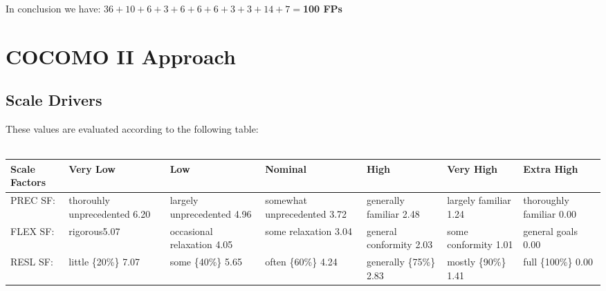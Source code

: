 \documentclass[12pt, oneside]{book}   	%
\begin{document}
In conclusion we have: $36 + 10 + 6 + 3 +6 + 6 + 6 + 3 + 3 +14 + 7 =$\textbf{100 FPs}
\chapter{COCOMO II Approach}
\section{Scale Drivers}
These values are evaluated according to the following table:
\\ \\
\begin{table}[h]
\centering
\begin{tabular}{|p{1.5cm}|p{2cm}|p{2cm}|p{2cm}|p{1.5cm}|p{2cm}|p{2cm}|}
\hline
Scale Factors & \multirow{2}{*}{Very Low} & \multirow{2}{*}{Low} & \multirow{2}{*}{Nominal} & \multirow{2}{*}{High} & \multirow{2}{*}{Very High} & \multirow{2}{*}{Extra High} \\
\hline
PREC \newline \newline SF: & \scriptsize{thorouhly unprecedented} \normalsize{6.20} & \scriptsize{largely unprecedented}  \normalsize{4.96} & \scriptsize{somewhat unprecedented} \normalsize{3.72} & \scriptsize{generally familiar} \normalsize{2.48} & \scriptsize{largely familiar} \newline \newline \normalsize{1.24} & \scriptsize{thoroughly familiar} \newline \normalsize{0.00} \\
\hline
FLEX \newline \newline SF: &  \scriptsize{rigorous}\newline \newline \normalsize{5.07} &  \scriptsize{occasional relaxation} \normalsize{4.05} &  \scriptsize{some relaxation} \normalsize{3.04} &  \scriptsize{general conformity} \normalsize{2.03} &  \scriptsize{some conformity} \newline \normalsize{1.01} &  \scriptsize{general goals} \newline \newline \normalsize{0.00} \\
\hline
RESL \newline \newline SF: &  \scriptsize{little \{20\%\}} \newline \newline \normalsize{7.07} &  \scriptsize{some \{40\%\}} \newline \newline \normalsize{5.65} & \scriptsize{often \{60\%\}} \newline \newline \normalsize{4.24} & \scriptsize{generally \{75\%\}} \normalsize{2.83} & \scriptsize{mostly \{90\%\}} \newline \newline \normalsize{1.41} &  \scriptsize{full \{100\%\}} \newline \newline \normalsize{0.00} \\

\end{tabular}
\end{table}
\end{document}
